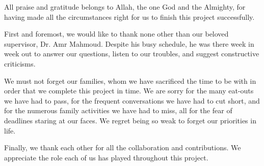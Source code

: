 \documentclass[../main.tex]{subfiles}
\begin{document}
All praise and gratitude belongs to Allah, the one God 
and the Almighty, for having made all the circumstances 
right for us to finish this project successfully.

First and foremost, we would like to thank none other than
our beloved supervisor, Dr. Amr Mahmoud. Despite his busy
schedule, he was there
week in week out to answer our questions, listen to our
troubles, and suggest constructive criticisms. 

We must not forget our families, whom we have sacrificed 
the time to be with in order that we complete this project
in time. We are
sorry for the many eat-outs we have had to pass, 
for the frequent conversations we have had to cut short,
and for the numerous family activities we have had to miss,
all for the fear of deadlines staring at our faces.
We regret being so weak to forget our priorities in life.

Finally, we thank each other for all the collaboration
and contributions. We appreciate the role each of us
has played throughout this project.
\end{document}

